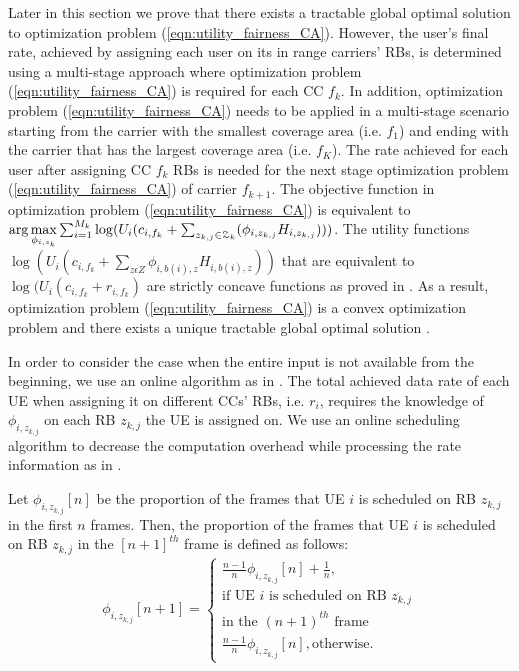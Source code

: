 \documentclass[conference]{IEEEtran}
\begin{document}
Later in this section we prove that there exists a tractable global optimal solution to optimization problem (\ref{eqn:utility_fairness_CA}). However, the user's final rate, achieved by assigning each user on its in range carriers' RBs, is determined using a multi-stage approach where optimization problem (\ref{eqn:utility_fairness_CA}) is required for each CC $f_k$. In addition, optimization problem (\ref{eqn:utility_fairness_CA}) needs to be applied in a multi-stage scenario starting from the carrier with the smallest coverage area (i.e. $f_1$) and ending with the carrier that has the largest coverage area (i.e. $f_K$). The rate achieved for each user after assigning CC $f_k$ RBs is needed for the next stage optimization problem (\ref{eqn:utility_fairness_CA}) of carrier $f_{k+1}$. The objective function in optimization problem (\ref{eqn:utility_fairness_CA}) is equivalent to $\arg \underset{\textbf{\textbf{$\phi_{i,z_k}$}}} \max \sum_{i=1}^{M_k}\log (U_i(c_{i,f_k}+\sum_{z_{k,j}\in \mathcal{Z}_k}(\phi_{i,z_{k,j}} H_{i,z_{k,j}})))$. The utility functions $\log(U_i(c_{i,f_k}+\sum_{z\epsilon Z}\phi_{i,b(i),z} H_{i,b(i),z}))$ that are equivalent to $\log(U_i(c_{i,f_k}+r_{i,f_k})$ are strictly concave functions as proved in \cite{Ahmed_Utility1}. As a result, optimization problem (\ref{eqn:utility_fairness_CA}) is a convex optimization problem and there exists a unique tractable global optimal solution \cite{Ahmed_Utility1,Haya_Utility1}.


In order to consider the case when the entire input is not available from the beginning, we use an online algorithm as in \cite{SelfOrganizedLTE,Tugba-RB}. The total achieved data rate of each UE when assigning it on different CCs' RBs, i.e. $r_i$, requires the knowledge of $\phi_{i,z_{k,j}}$ on each RB $z_{k,j}$ the UE is assigned on. We use an online scheduling algorithm to decrease the computation overhead while processing the rate information as in \cite{SelfOrganizedLTE}.

Let $\phi_{i,z_{k,j}}[n]$ be the proportion of the frames that UE $i$ is scheduled on RB $z_{k,j}$ in the first $n$ frames. Then, the proportion of the frames that UE $i$ is scheduled on RB $z_{k,j}$ in the $[n+1]^{th}$ frame is defined as follows:
\vspace{-0.5em}
\begin{equation}\label{eqn:online_algorithm}
\begin{aligned}
\phi_{i,z_{k,j}}[n+1]=
\begin{cases}
	\frac{n-1}{n}\phi_{i,z_{k,j}}[n]+\frac{1}{n},\\
	\text{if UE $i$ is scheduled on RB $z_{k,j}$}\\
	\text{in the $(n+1)^{th}$ frame}\\
	\frac{n-1}{n}\phi_{i,z_{k,j}}[n],\text{otherwise}.
\end{cases}
\end{aligned}
\end{equation}
\end{document}
